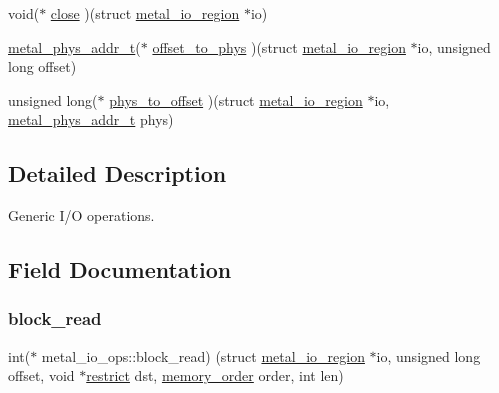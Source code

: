 \begin{DoxyCompactItemize}
\item 
void($\ast$ \hyperlink{structmetal__io__ops_a25310b7272817558438e1feb03b24d14}{close} )(struct \hyperlink{structmetal__io__region}{metal\+\_\+io\+\_\+region} $\ast$io)
\item 
\hyperlink{group__system_gae024fa10b72199a3e26c29b6eb97df5d}{metal\+\_\+phys\+\_\+addr\+\_\+t}($\ast$ \hyperlink{structmetal__io__ops_a609d8698238e0895b98fdc5c4fad67a3}{offset\+\_\+to\+\_\+phys} )(struct \hyperlink{structmetal__io__region}{metal\+\_\+io\+\_\+region} $\ast$io, unsigned long offset)
\item 
unsigned long($\ast$ \hyperlink{structmetal__io__ops_a4f7597eddef002c9a66eb042179c016c}{phys\+\_\+to\+\_\+offset} )(struct \hyperlink{structmetal__io__region}{metal\+\_\+io\+\_\+region} $\ast$io, \hyperlink{group__system_gae024fa10b72199a3e26c29b6eb97df5d}{metal\+\_\+phys\+\_\+addr\+\_\+t} phys)
\end{DoxyCompactItemize}


\subsection{Detailed Description}
Generic I/O operations. 

\subsection{Field Documentation}
\mbox{\label{structmetal__io__ops_aef9e6cebfe3c55299f18763b10ca463e}} 
\subsubsection{\texorpdfstring{block\+\_\+read}{block\_read}}
{\footnotesize\ttfamily int($\ast$ metal\+\_\+io\+\_\+ops\+::block\+\_\+read) (struct \hyperlink{structmetal__io__region}{metal\+\_\+io\+\_\+region} $\ast$io, unsigned long offset, void $\ast$\hyperlink{compiler_2iar_2compiler_8h_a080abdcb9c02438f1cd2bb707af25af8}{restrict} dst, \hyperlink{compiler_2gcc_2atomic_8h_a17c2de5ae768960284c047a320f17d1b}{memory\+\_\+order} order, int len)}

\mbox{\label{structmetal__io__ops_af70cb8c3927ddf353c0c36503e033a98}} 
